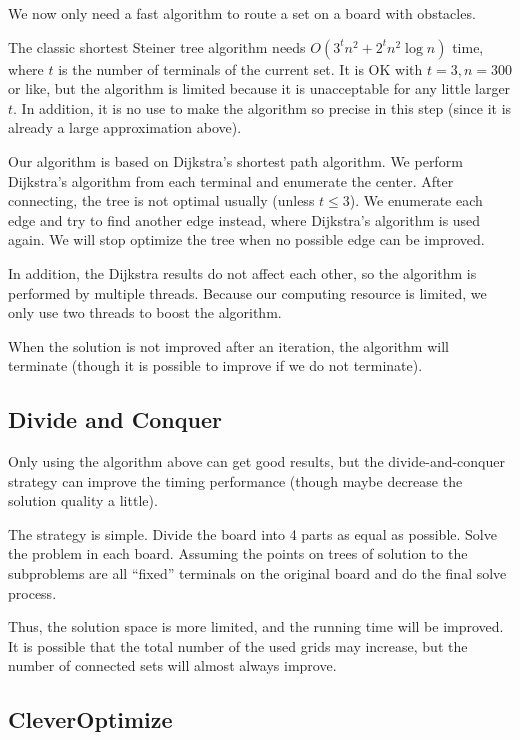 \documentclass[12pt, a4paper]{article}
\begin{document}
	We now only need a fast algorithm to route a set on a board with obstacles.
	
	The classic shortest Steiner tree algorithm needs $O(3^t n^2 + 2^t n^2 \log n)$ time, where $t$ is the number of terminals of the current set. It is OK with $t = 3, n = 300$ or like, but the algorithm is limited because it is unacceptable for any little larger $t$. In addition, it is no use to make the algorithm so precise in this step (since it is already a large approximation above).
	
	Our algorithm is based on Dijkstra's shortest path algorithm. We perform Dijkstra's algorithm from each terminal and enumerate the center. After connecting, the tree is not optimal usually (unless $t \leq 3$). We enumerate each edge and try to find another edge instead, where Dijkstra's algorithm is used again. We will stop optimize the tree when no possible edge can be improved.
	
	In addition, the Dijkstra results do not affect each other, so the algorithm is performed by multiple threads. Because our computing resource is limited, we only use two threads to boost the algorithm.
	
	When the solution is not improved after an iteration, the algorithm will terminate (though it is possible to improve if we do not terminate).
	
	\subsection{Divide and Conquer}
	
	Only using the algorithm above can get good results, but the divide-and-conquer strategy can improve the timing performance (though maybe decrease the solution quality a little).
	
	The strategy is simple. Divide the board into 4 parts as equal as possible. Solve the problem in each board. Assuming the points on trees of solution to the subproblems are all ``fixed'' terminals on the original board and do the final solve process.
	
	Thus, the solution space is more limited, and the running time will be improved. It is possible that the total number of the used grids may increase, but the number of connected sets will almost always improve.
	
	\subsection{CleverOptimize}
		
\end{document}
